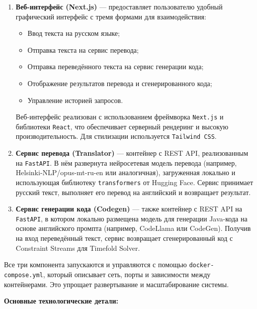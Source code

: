 \begin{enumerate}
    \item \textbf{Веб-интерфейс (Next.js)} — предоставляет пользователю удобный графический интерфейс с тремя формами для взаимодействия:
    \begin{itemize}
        \item Ввод текста на русском языке;
        \item Отправка текста на сервис перевода;
        \item Отправка переведённого текста на сервис генерации кода;
        \item Отображение результатов перевода и сгенерированного кода;
        \item Управление историей запросов.
    \end{itemize}

    Веб-интерфейс реализован с использованием фреймворка \texttt{Next.js} и библиотеки \texttt{React}, что обеспечивает серверный рендеринг и высокую производительность. Для стилизации используется \texttt{Tailwind CSS}.

    \item \textbf{Сервис перевода (Translator)} — контейнер с REST API, реализованным на \texttt{FastAPI}. В нём развернута нейросетевая модель перевода (например, Helsinki-NLP/opus-mt-ru-en или аналогичная), загруженная локально и использующая библиотеку \texttt{transformers} от Hugging Face. Сервис принимает русский текст, выполняет его перевод на английский и возвращает результат.

    \item \textbf{Сервис генерации кода (Codegen)} — также контейнер с REST API на \texttt{FastAPI}, в котором локально размещена модель для генерации Java-кода на основе английского промпта (например, CodeLlama или CodeGen). Получив на вход переведённый текст, сервис возвращает сгенерированный код с Constraint Streams для Timefold Solver.

\end{enumerate}

Все три компонента запускаются и управляются с помощью \texttt{docker-compose.yml}, который описывает сеть, порты и зависимости между контейнерами. Это упрощает развертывание и масштабирование системы.

\bigskip

\textbf{Основные технологические детали:}


